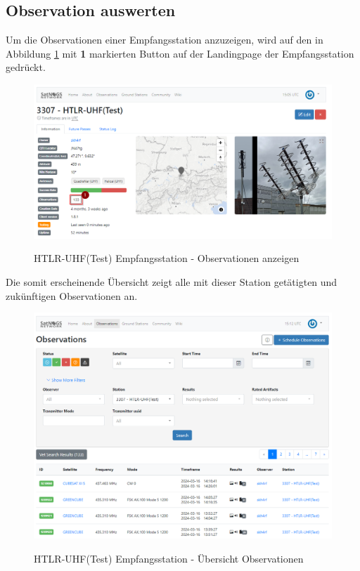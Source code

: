 \subsection{Observation auswerten}
Um die Observationen einer Empfangsstation anzuzeigen, wird auf den in Abbildung \ref{fig:htrl-uhf(test)showobservations} mit \textbf{1} markierten Button auf der Landingpage der Empfangsstation gedrückt.

\begin{figure} [H]
	\centering
	\includegraphics[width=\linewidth]{../ref/show_observation.png}
	\caption{HTLR-UHF(Test) Empfangsstation - Observationen anzeigen} \cite{noauthor_satnogs_nodate}
	\label{fig:htrl-uhf(test)showobservations}
\end{figure}

Die somit erscheinende Übersicht zeigt alle mit dieser Station getätigten und zukünftigen Observationen an.

\begin{figure} [H]
	\centering
	\includegraphics[width=.75\linewidth]{../ref/overview_observations.png}
	\caption{HTLR-UHF(Test) Empfangsstation - Übersicht Observationen} \cite{noauthor_satnogs_nodate}
	\label{fig:htrl-uhf(test)overviewobservations}
\end{figure}

